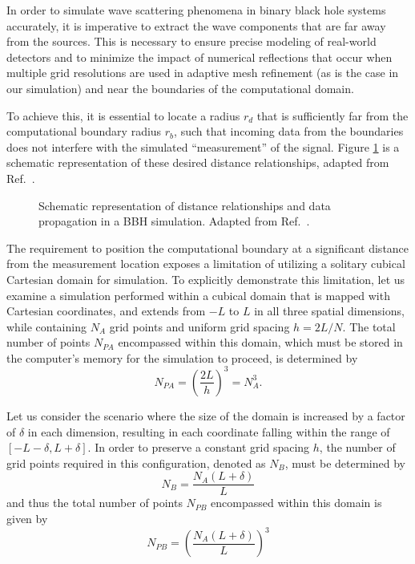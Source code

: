 In order to simulate wave scattering phenomena in binary black hole systems accurately, it is imperative to extract the wave components that are far away from the sources. This is necessary to ensure precise modeling of real-world detectors and to minimize the impact of numerical reflections that occur when multiple grid resolutions are used in adaptive mesh refinement (as is the case in our simulation) and near the boundaries of the computational domain.

To achieve this, it is essential to locate a radius $r_d$ that is sufficiently far from the computational boundary radius $r_b$, such that incoming data from the boundaries does not interfere with the simulated ``measurement'' of the signal. Figure \ref{fig:wave_scattering_multipatch_signal} is a schematic representation of these desired distance relationships, adapted from Ref.~\cite{Reisswig2010}.

\begin{figure}[h]
  \centering
  
  \caption{Schematic representation of distance relationships and data propagation in a \ac{BBH} simulation. Adapted from Ref.~\cite{Reisswig2010}.}
  \label{fig:wave_scattering_multipatch_signal}
\end{figure}

The requirement to position the computational boundary at a significant distance from the measurement location exposes a limitation of utilizing a solitary cubical Cartesian domain for simulation. To explicitly demonstrate this limitation, let us examine a simulation performed within a cubical domain that is mapped with Cartesian coordinates, and extends from $-L$ to $L$ in all three spatial dimensions, while containing $N_A$ grid points and uniform grid spacing $h=2L/N$. The total number of points $N_{PA}$ encompassed within this domain, which must be stored in the computer's memory for the simulation to proceed, is determined by
%
\begin{equation}
  N_{PA} = \left( \frac{2L}{h} \right)^3 = N_A^3.
  \label{eq:wave_scattering_npa}
\end{equation}

Let us consider the scenario where the size of the domain is increased by a factor of $\delta$ in each dimension, resulting in each coordinate falling within the range of $[-L-\delta, L+\delta]$. In order to preserve a constant grid spacing $h$, the number of grid points required in this configuration, denoted as $N_B$, must be determined by
%
\begin{equation}
  N_{B} = \frac{N_A(L + \delta)}{L}
  \label{eq:wave_scattering_nb}
\end{equation}
%
and thus the total number of points $N_{PB}$ encompassed within this domain is given by
%
\begin{equation}
  N_{PB} = \left(\frac{N_A(L + \delta)}{L}\right)^3
  \label{eq:wave_scattering_npb}
\end{equation}


